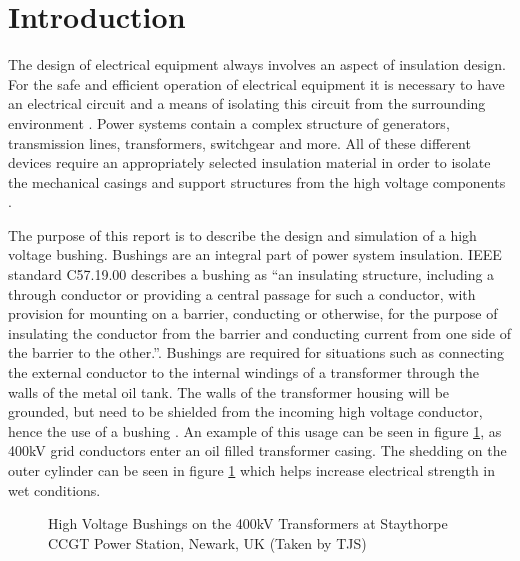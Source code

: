 \section{Introduction}
The design of electrical equipment always involves an aspect of insulation design.
For the safe and efficient operation of electrical equipment it is necessary to have an electrical circuit and a means of isolating this circuit from the surrounding environment \cite{warne2005newnes}.
Power systems contain a complex structure of generators, transmission lines, transformers, switchgear and more. 
All of these different devices require an appropriately selected insulation material in order to isolate the mechanical casings and support structures from the high voltage components \cite{james2008condition}.

The purpose of this report is to describe the design and simulation of a high voltage bushing. Bushings are an integral part of power system insulation. 
IEEE standard C57.19.00 describes a bushing as ``an insulating structure, including a through conductor or providing a central passage for such a conductor, with provision for mounting on a barrier, conducting or otherwise, for the purpose of insulating the conductor from the barrier and conducting current from one side of the barrier to the other.''\cite{1440990}.
Bushings are required for situations such as connecting the external conductor to the internal windings of a transformer through the walls of the metal oil tank.
The walls of the transformer housing will be grounded, but need to be shielded from the incoming high voltage conductor, hence the use of a bushing \cite{warne2005newnes}.
An example of this usage can be seen in figure \ref{Figure:BothBushPics}, as 400kV grid conductors enter an oil filled transformer casing.
The shedding on the outer cylinder can be seen in figure \ref{Figure:BothBushPics} which helps increase electrical strength in wet conditions.

\begin{figure}[!htb]
  \centering
\caption{High Voltage Bushings on the 400kV Transformers at Staythorpe CCGT Power Station, Newark, UK (Taken by TJS)}
  \label{Figure:BothBushPics}
\end{figure}

